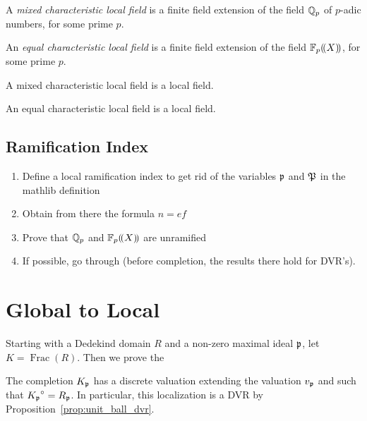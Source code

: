 \begin{definition}
\label{mixed_char_local_field}
\leanok
A \textit{mixed characteristic local field} is a finite field extension of the field 
$\Qp$ of $p$-adic numbers, for some prime $p$.
\end{definition}

\begin{definition}
\label{eq_char_local_field}
\leanok
An \textit{equal characteristic local field} is a finite field extension of the field 
$\laurentseries$, for some prime $p$.
\end{definition}

\begin{lemma}
\label{mixed_char_local_field.local_field}
A mixed characteristic local field is a local field.
\end{lemma}

\begin{lemma}
\label{eq_char_local_field.local_field}
An equal characteristic local field is a local field.
\end{lemma}
\subsection{Ramification Index}
\begin{enumerate}
\item Define a local ramification index to get rid of the variables $\primeid$ and $\primeid[P]$ in the mathlib definition
\item Obtain from there the formula $n=ef$
\item Prove that $\Qp$ and $\laurentseries$ are unramified
\item If possible, go through \cite[Chap. I, \S6]{Se2} (before completion, the results there hold for DVR's).
\end{enumerate}
\section{Global to Local}
Starting with a Dedekind domain $R$ and a non-zero maximal ideal $\primeid$, let $K=\operatorname{Frac}(R)$. Then we prove the
\begin{proposition}
\label{prop:extension_equal}
The completion $K_{\primeid}$ has a discrete valuation extending the valuation $v_{\primeid}$ and such that $\unitball{K_{\primeid}}=R_{\primeid}$. In particular, this localization is a DVR by Proposition~\ref{prop:unit_ball_dvr}.
\end{proposition}

